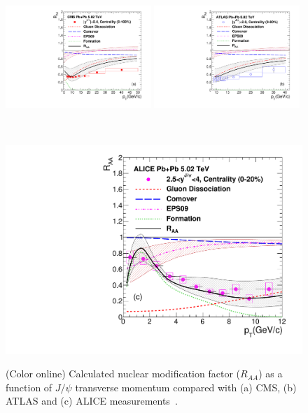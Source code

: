 \documentclass[12pt,a4paper,final]{iopart} %
\newcommand{\Jpsi}{J/\psi}
\begin{document}
\begin{figure}
\begin{minipage}{1.0\linewidth}
\centering
{\includegraphics[width=0.49\textwidth]{Fig4a_CMS_RAAPt_Shade.pdf}}
{\includegraphics[width=0.49\textwidth]{Fig4b_ATLAS_RAAPt_Shade.pdf}}
\end{minipage}%
\ \\
\centering
\begin{minipage}{0.5\linewidth}
\centering
{\includegraphics[width=1.0\textwidth]{Fig4c_ALICE_RAAPt_Shade.pdf}}
\end{minipage}%
\caption{(Color online)
Calculated nuclear modification factor ($R_{AA}$) as a function of $\Jpsi$ 
transverse momentum compared with (a) CMS, (b) ATLAS and (c) ALICE
measurements~\cite{Sirunyan:2017isk,ATLAS:2016qpn,Adam:2016rdg}.}
\label{fig:JPsiRaaVsPt}
\end{figure}
\end{document}
